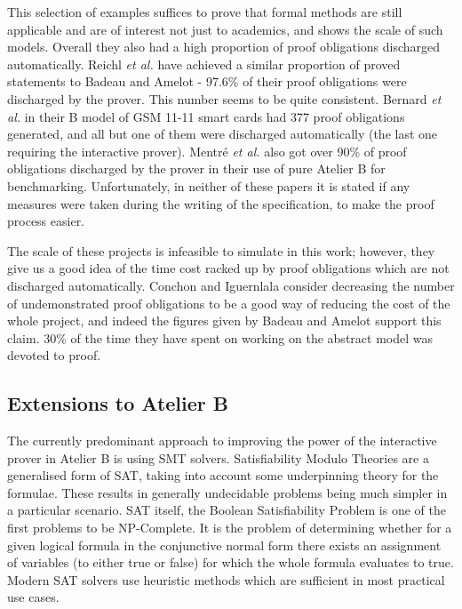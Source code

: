 \documentclass[12pt,journal,duplex]{IEEEtran}
\begin{document}
	This selection of examples suffices to prove that formal methods are still applicable and are of interest not just to academics, and shows the scale of such models. Overall they also had a high proportion of proof obligations discharged automatically. Reichl \emph{et al.} have achieved a similar proportion of proved statements to Badeau and Amelot - 97.6\% of their proof obligations were discharged  by the prover. This number seems to be quite consistent. Bernard \emph{et al.} in their B model of GSM 11-11 smart cards had 377 proof obligations generated, and all but one of them were discharged automatically (the last one requiring the interactive prover)\cite{GSM}. Mentr\'{e} \emph{et al.} also got over 90\% of proof obligations discharged by the prover in their use of pure Atelier B for benchmarking.\cite{discharging} 	Unfortunately, in neither of these papers it is stated if any measures were taken during the writing of the specification, to make the proof process easier.

	The scale of these projects is infeasible to simulate in this work; however, they give us a good idea of the time cost racked up by proof obligations which are not discharged automatically. Conchon and Iguernlala consider decreasing the number of undemonstrated proof obligations to be a good way of reducing the cost of the whole project\cite{survey}, and indeed the figures given by Badeau and Amelot support this claim. 30\% of the time they have spent on working on the abstract model was devoted to proof\cite{airport shuttle}.


	\subsection{Extensions to Atelier B}
	
	The currently predominant approach to improving the power of the interactive prover in Atelier B is using SMT solvers. Satisfiability Modulo Theories are a generalised form of SAT, taking into account some underpinning theory for the formulae.  These results in generally undecidable problems being much simpler in a particular scenario.\cite{SMT handbook} SAT itself, the Boolean Satisfiability Problem is one of the first problems to be NP-Complete. It is the problem of determining whether for a given logical formula in the  conjunctive normal form there exists an assignment of variables (to either true or false) for which the whole formula evaluates to true. Modern SAT solvers use heuristic methods which are sufficient in most practical use cases\cite{SAT}.
	
\end{document}
